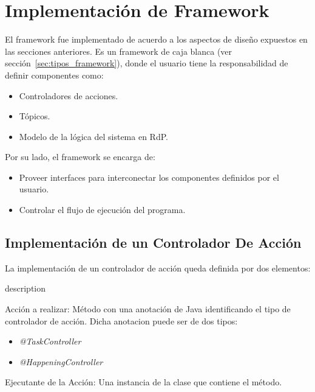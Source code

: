 \section{Implementación de \nombreFramework Framework}
El framework fue implementado de acuerdo a los aspectos de diseño expuestos en
las secciones anteriores. Es un framework de caja blanca (ver
sección~\ref{sec:tipos_framework}), donde el usuario tiene la
responsabilidad de definir componentes como:
\begin{itemize} 
  \item Controladores de acciones.
  \item Tópicos.
  \item Modelo de la lógica del sistema en RdP.
\end{itemize}

Por su lado, el framework se encarga de:
\begin{itemize} 
  \item Proveer interfaces para interconectar los componentes definidos por el
  usuario.
  \item Controlar el flujo de ejecución del programa.
\end{itemize}

\subsection{Implementación de un Controlador De Acción}
\label{sec:implementacion_controlador_accion}
La implementación de un controlador de acción queda definida por dos elementos:
\begin{labeling}{description}
  \item [Acción a realizar: ] Método con una anotación de Java
  identificando el tipo de controlador de acción. 
  Dicha anotacion puede ser de dos tipos:
  \begin{itemize}
    \item \emph{@TaskController}
    \item \emph{@HappeningController}
  \end{itemize}
  \item [Ejecutante de la Acción: ] Una instancia de la clase que contiene el
  método.
\end{labeling}


